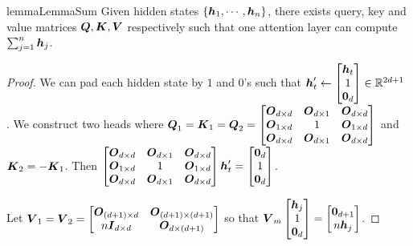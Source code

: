 \begin{restatable}{lemma}{LemmaSum} \label{lemma:sum}
    Given hidden states $\{\boldsymbol{h}_1, \cdots, \boldsymbol{h}_n\}$, there exists query, key and value matrices $\boldsymbol{Q}, \boldsymbol{K}, \boldsymbol{V}$ respectively such that one attention layer can compute $\sum_{j=1}^n \boldsymbol{h}_j$. 
\end{restatable}
\begin{proof}
We can pad each hidden state by $1$ and $0$'s such that $\boldsymbol{h}_t' \leftarrow \begin{bmatrix}
    \boldsymbol{h}_t \\ 1 \\ \boldsymbol{0}_d
\end{bmatrix} \in \mathbb R^{2d+1}$ . We construct two heads where $\boldsymbol{Q}_1 = \boldsymbol{K}_1 = \boldsymbol{Q}_2 = \begin{bmatrix}
    \boldsymbol{O}_{d \times d} & \boldsymbol{O}_{d \times 1} & \boldsymbol{O}_{d \times d}\\
    \boldsymbol{O}_{1 \times d} & 1  & \boldsymbol{O}_{1 \times d} \\
    \boldsymbol{O}_{d \times d} & \boldsymbol{O}_{d \times 1} & \boldsymbol{O}_{d \times d}
\end{bmatrix}$ and $\boldsymbol{K}_2 = -\boldsymbol{K}_1$. Then $\begin{bmatrix}
    \boldsymbol{O}_{d \times d} & \boldsymbol{O}_{d \times 1} & \boldsymbol{O}_{d \times d}\\
    \boldsymbol{O}_{1 \times d} & 1  & \boldsymbol{O}_{1 \times d} \\
    \boldsymbol{O}_{d \times d} & \boldsymbol{O}_{d \times 1} & \boldsymbol{O}_{d \times d}
\end{bmatrix} \boldsymbol{h}_t' = \begin{bmatrix}
    \boldsymbol{0}_d \\ 1 \\ \boldsymbol{0}_d
\end{bmatrix}$.

Let $\boldsymbol{V}_1 = \boldsymbol{V}_2 = \begin{bmatrix}
    \boldsymbol{O}_{(d+1) \times d} & \boldsymbol{O}_{(d+1) \times (d+1)} \\
    n\boldsymbol{I}_{d \times d}  &  \boldsymbol{O}_{d \times (d+1)}
\end{bmatrix}$ so that $\boldsymbol{V}_m \begin{bmatrix}
    \boldsymbol{h}_j \\ 1 \\ \boldsymbol{0}_d
\end{bmatrix} = \begin{bmatrix}
    \boldsymbol{0}_{d+1} \\ n \boldsymbol{h}_j 
\end{bmatrix}$. 


\end{proof}
